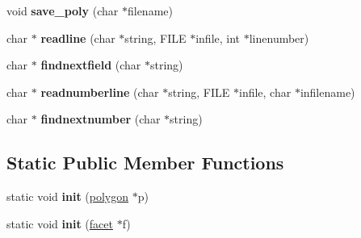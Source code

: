 \begin{DoxyCompactItemize}
void {\bfseries save\+\_\+poly} (char $\ast$filename)
\item 
\mbox{\label{classStemMesh3D_1_1tetgenio_a03cd753e6b48b419d538bfb48b87469c}} 
char $\ast$ {\bfseries readline} (char $\ast$string, F\+I\+LE $\ast$infile, int $\ast$linenumber)
\item 
\mbox{\label{classStemMesh3D_1_1tetgenio_a63cd8cf14961e8cafa5a543c7bf651b4}} 
char $\ast$ {\bfseries findnextfield} (char $\ast$string)
\item 
\mbox{\label{classStemMesh3D_1_1tetgenio_a12755b132e01188103f40384f7cc5a9d}} 
char $\ast$ {\bfseries readnumberline} (char $\ast$string, F\+I\+LE $\ast$infile, char $\ast$infilename)
\item 
\mbox{\label{classStemMesh3D_1_1tetgenio_a35197f177bf5ffd75c181c245d2c4b36}} 
char $\ast$ {\bfseries findnextnumber} (char $\ast$string)
\end{DoxyCompactItemize}
\subsection*{Static Public Member Functions}
\begin{DoxyCompactItemize}
\item 
\mbox{\label{classStemMesh3D_1_1tetgenio_aad465116bd4a3b81668f09ca639545d8}} 
static void {\bfseries init} (\hyperlink{structStemMesh3D_1_1tetgenio_1_1polygon}{polygon} $\ast$p)
\item 
\mbox{\label{classStemMesh3D_1_1tetgenio_a82b49bf2fe508832efb12cf290b74d17}} 
static void {\bfseries init} (\hyperlink{structStemMesh3D_1_1tetgenio_1_1facet}{facet} $\ast$f)
\end{DoxyCompactItemize}
